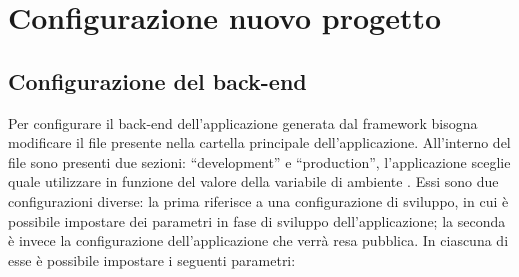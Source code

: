 \section{Configurazione nuovo progetto}
\label{config}

\subsection{Configurazione del back-end}

Per configurare il back-end dell'applicazione generata dal framework bisogna modificare il file  presente nella cartella principale dell'applicazione. All'interno del file sono presenti due sezioni: ``development'' e ``production'', l'applicazione sceglie quale utilizzare in funzione del valore della variabile di ambiente . Essi sono due configurazioni diverse: la prima riferisce a una configurazione di sviluppo, in cui è possibile impostare dei parametri in fase di sviluppo dell'applicazione; la seconda è invece la configurazione dell'applicazione che verrà resa pubblica. In ciascuna di esse è possibile impostare i seguenti parametri:

